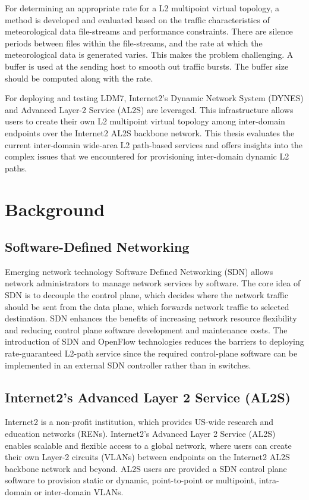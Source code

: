For determining an appropriate rate for a L2 multipoint virtual topology, a method is developed and evaluated based on the traffic characteristics of meteorological data file-streams and performance constraints. There are silence periods between files within the file-streams, and the rate at which the meteorological data is generated varies. This makes the problem challenging. A buffer is used at the
sending host to smooth out traffic bursts. The buffer size should
be computed along with the rate.

For deploying and testing LDM7, Internet2's Dynamic Network System (DYNES) \cite{1742-6596-396-4-042065} and Advanced Layer-2 Service (AL2S) \cite{AL2S} are leveraged. This infrastructure allows users to create their own L2 multipoint virtual topology among inter-domain endpoints over the Internet2 AL2S backbone network. This thesis evaluates the current inter-domain wide-area L2 path-based services and offers insights into the complex issues that we encountered for provisioning inter-domain dynamic L2 paths. 



\section{Background}
\label{sec:background}

\subsection{Software-Defined Networking}
Emerging network technology Software Defined Networking (SDN) \cite{SDNs} allows network administrators to manage network services by software. The core idea of SDN is to decouple the control plane, which decides where the network traffic should be sent from the data plane, which forwards network traffic to selected destination. SDN enhances the benefits of increasing network resource flexibility and reducing control plane software development and maintenance costs. The introduction of SDN and OpenFlow \cite{OpenFlow} technologies reduces the barriers to deploying rate-guaranteed L2-path service since the required control-plane software can be implemented in an external SDN controller rather than in switches.

\subsection{Internet2's Advanced Layer 2 Service (AL2S)}
Internet2 \cite{Internet2} is a non-profit institution, which provides US-wide research and education networks (RENs). Internet2's Advanced Layer 2 Service (AL2S) \cite{AL2S} enables scalable and flexible access to a global network, where users can create their own Layer-2 circuits (VLANs) between endpoints on the Internet2 AL2S backbone network and beyond. AL2S users are provided a SDN control plane software to provision static or dynamic, point-to-point or multipoint, intra-domain or inter-domain VLANs.  

